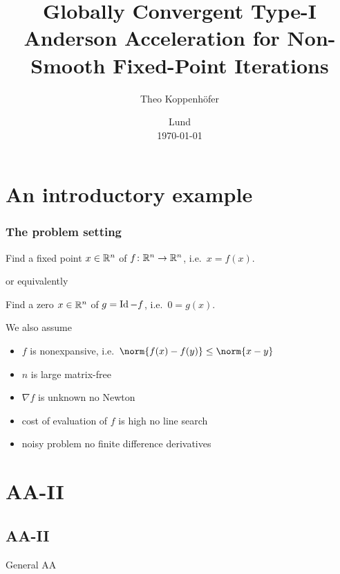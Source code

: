 %




\subject{, VT23}
\title{%
Globally Convergent Type-I Anderson Acceleration for Non-Smooth Fixed-Point Iterations}
\author{Theo Koppenhöfer}
\date{Lund \\[1ex] \today}








\frame[plain]



\frame[plain]{\titlepage}


\section{An introductory example}
\begin{frame}
	\frametitle{The problem setting}
	\begin{problem}
		Find a fixed point $x\in\mathbb{R}^n$ of $f\colon\mathbb{R}^n\to\mathbb{R}^n$, i.e.\ $x=f(x)$.
	\end{problem}
	or equivalently
	\begin{problem}
		Find a zero $x\in\mathbb{R}^n$ of $g=\operatorname{Id}-f$, i.e.\ $0=g(x)$.
	\end{problem}
	We also assume
	\begin{itemize}
		\item $f$ is nonexpansive, i.e.\ $\norm{f(x)-f(y)}\leq\norm{x-y}$
		\item $n$ is large \textrightarrow matrix-free
		\item $\nabla f$ is unknown \textrightarrow no Newton
		\item cost of evaluation of $f$ is high \textrightarrow no line search
		\item noisy problem \textrightarrow no finite difference derivatives
	\end{itemize}
\end{frame}

\section{AA-II}
\subsection{AA-II}
\begin{frame}
	\begin{algorithm}[H]
	\caption{General AA}\label{alg:cap}
	
	\BlankLine
	\end{algorithm}
\end{frame}


